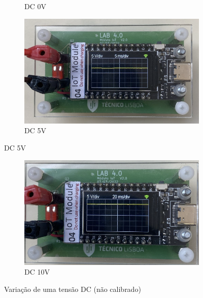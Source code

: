 \begin{figure}[H]
\begin{subfigure}{0.35\textwidth}
        \captionsetup{justification=centering}
        \caption{DC 0V}
        \label{fig:DC 0V não calibrado}
    \end{subfigure}
    \begin{subfigure}{0.35\textwidth}
        \centering
        \includegraphics[width=1\linewidth]{Imagens/Testes no laboratório/Não calibrado/DC 5V.png}
        \captionsetup{justification=centering}
        \caption{DC 5V}
        \label{fig:DC 5V não calibrado}
    \end{subfigure}
\end{figure}

\begin{figure}[H]\ContinuedFloat
    \centering
    \begin{subfigure}{0.35\textwidth}
        \centering
        \includegraphics[width=1\linewidth]{Imagens/Testes no laboratório/Não calibrado/DC 10V.png}
        \captionsetup{justification=centering}
        \caption{DC 10V}
        \label{fig:DC 10V não calibrado}
    \end{subfigure}
    \captionsetup{justification=centering}
    \caption{Variação de uma tensão DC (não calibrado)}
    \label{fig:Variação de uma tensão DC (não calibrado)}
\end{figure}

